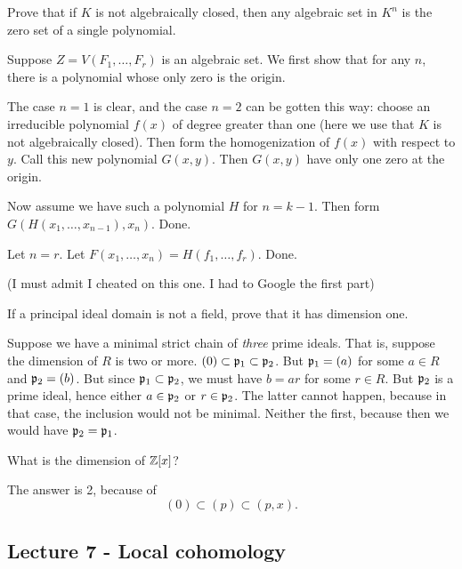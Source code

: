 \documentclass[11pt, english]{article}
\begin{document}
\begin{oppg}[Exercise 1.11]
Prove that if $K$ is not algebraically closed, then any algebraic set in $K^n$ is the zero set of a single polynomial.
\end{oppg}
\begin{losn}
Suppose $Z=V(F_1,\ldots,F_r)$ is an algebraic set. We first show that for any $n$, there is a polynomial whose only zero is the origin. 

The case $n=1$ is clear, and the case $n=2$ can be gotten this way: choose an irreducible polynomial $f(x)$ of degree greater than one (here we use that $K$ is not algebraically closed). Then form the homogenization of $f(x)$ with respect to $y$. Call this new polynomial $G(x,y)$. Then $G(x,y)$ have only one zero at the origin. 

Now assume we have such a polynomial $H$ for $n=k-1$. Then form $G(H(x_1,\ldots,x_{n-1}),x_n)$. Done.

Let $n=r$. Let $F(x_1,\ldots,x_n)=H(f_1,\ldots,f_r)$. Done.

(I must admit I cheated on this one. I had to Google the first part)
\end{losn}

\begin{oppg}[Exc 1.14]
If a principal ideal domain is not a field, prove that it has dimension one.
\end{oppg}
\begin{losn}
Suppose we have a minimal strict chain of \emph{three} prime ideals. That is, suppose the dimension of $R$ is two or more. $(0) \subset \mathfrak{p}_1 \subset \mathfrak{p}_2$. But $\mathfrak{p}_1=(a)$ for some $a \in R$ and $\mathfrak{p}_2=(b)$. But since $\mathfrak{p}_1 \subset \mathfrak{p}_2$, we must have $b=ar$ for some $r \in R$. But $\mathfrak{p}_2$ is a prime ideal, hence either $a \in \mathfrak{p}_2$ or $r \in \mathfrak{p}_2$. The latter cannot happen, because in that case, the inclusion would not be minimal. Neither the first, because then we would have $\mathfrak{p}_2 = \mathfrak{p}_1$. 
\end{losn}

\begin{exc}
What is the dimension of $\mathbb{Z}[x]$? 
\end{exc}
\begin{sol}
The answer is 2, because of
$$
(0) \subset (p) \subset (p,x).
$$
\end{sol}

\subsection{Lecture 7 - Local cohomology}
\end{document}
